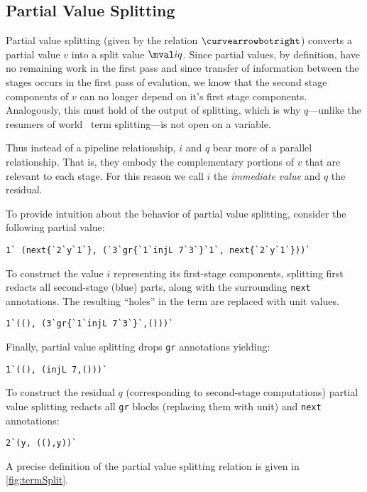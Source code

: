 \begin{abstrsyn}
\subsection{Partial Value Splitting}
\label{sec:masking}

Partial value splitting (given by the relation $\vsplito$) converts a 
partial value $v$ into a split value $\mval i q$.
Since partial values, by definition, have no remaining work in the first pass
and since transfer of information between the stages occurs in the first pass of evalution,
we know that the second stage components of $v$ can no longer depend on it's first stage components.
Analogously, this must hold of the output of splitting, 
which is why $q$---unlike the resumers of world \bbtwo\ term splitting---is not open on a variable.

Thus instead of a pipeline relationship, $i$ and $q$ bear more of a parallel relationship.
That is, they embody the complementary portions of $v$ that are relevant to each stage.
For this reason we call $i$ the \emph{immediate value} and $q$ the residual.

To provide intuition about the behavior of partial value splitting, consider the
following partial value:
\begin{lstlisting}
1` (next{`2`y`1`}, (`3`gr{`1`injL 7`3`}`1`, next{`2`y`1`}))`
\end{lstlisting}
To construct the value $i$ representing its first-stage components,
splitting first redacts all second-stage (blue) parts, along with the
surrounding \texttt{next} annotations. 
The resulting ``holes'' in the term are replaced with
unit values.
\begin{lstlisting}
1`((), (3`gr{`1`injL 7`3`}`,()))`
\end{lstlisting}
Finally, partial value splitting drops \texttt{gr} annotations yielding:
\begin{lstlisting}
1`((), (injL 7,()))`
\end{lstlisting}
To construct the residual $q$ (corresponding to second-stage computations) partial value splitting redacts all \texttt{gr} blocks
(replacing them with unit) and \texttt{next} annotations:
\begin{lstlisting}
2`(y, ((),y))`
\end{lstlisting}
A precise definition of the partial value splitting relation is given in
\ref{fig:termSplit}.


\end{abstrsyn}
